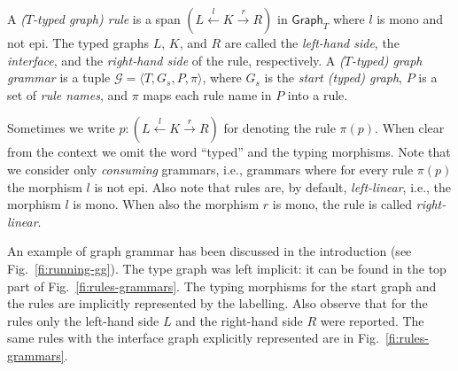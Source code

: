 \documentclass[conference]{IEEEtran}
\newcommand{\tgraph}[1]{\ensuremath{\mathsf{Graph}_{#1}}}
\begin{document}
\begin{definition} 
  A \emph{($T$-typed graph) rule} is a span
  $(L \stackrel{l}{\leftarrow} K \stackrel{r}{\rightarrow} R)$ in
  $\tgraph{T}$ where $l$ is mono and not epi.
  The typed graphs $L$, $K$, and $R$ are called the \emph{left-hand side},
  the \emph{interface}, and the \emph{right-hand side} of the rule, respectively. 
  A \emph{($T$-typed) graph grammar} is a tuple
  $\mathcal{G} = \langle T, G_s, P, \pi \rangle$, where $G_s$ is the
  \emph{start (typed) graph}, $P$ is a 
  set of \emph{rule names}, and
  $\pi$ maps each rule name in $P$ into a rule.
\end{definition}
%
Sometimes we write
$p:(L \stackrel{l}{\leftarrow} K \stackrel{r}{\rightarrow} R)$ for
%
denoting the rule $\pi(p)$.  When clear from the context we omit the
word ``typed'' and the typing morphisms.  Note that we consider only
\emph{consuming} grammars, i.e., grammars where for every rule
$\pi(p)$
the morphism $l$ is not epi.  
%
Also note that rules are, by default, \emph{left-linear}, i.e., the morphism
$l$ is mono. When also the morphism $r$ is mono, the rule is called
\emph{right-linear}.


An example of graph grammar has been discussed in the introduction
(see Fig.~\ref{fi:running-gg}). The type graph was left implicit: it
can be found in the top part of Fig.~\ref{fi:rules-grammars}. The
typing morphisms for the start graph and the rules are implicitly
represented by the labelling. Also observe that for the rules only the
left-hand side $L$ and the right-hand side $R$ were reported. The same
rules with the interface graph explicitly represented are in
Fig.~\ref{fi:rules-grammars}.
\end{document}
